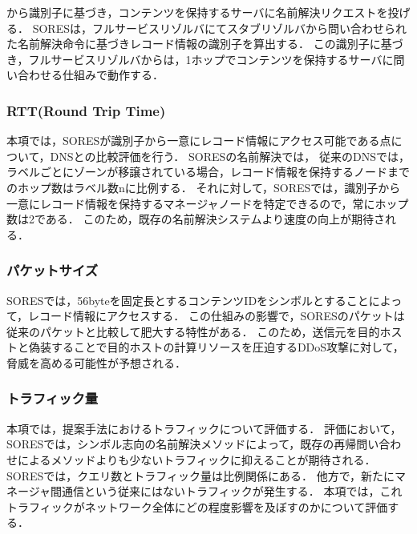 から識別子に基づき，コンテンツを保持するサーバに名前解決リクエストを投げる．
SORESは，フルサービスリゾルバにてスタブリゾルバから問い合わせられた名前解決命令に基づきレコード情報の識別子を算出する．
この識別子に基づき，フルサービスリゾルバからは，1ホップでコンテンツを保持するサーバに問い合わせる仕組みで動作する．
\subsubsection{RTT(Round Trip Time)}
本項では，SORESが識別子から一意にレコード情報にアクセス可能である点について，DNSとの比較評価を行う．
SORESの名前解決では，
従来のDNSでは，ラベルごとにゾーンが移譲されている場合，レコード情報を保持するノードまでのホップ数はラベル数nに比例する．
それに対して，SORESでは，識別子から一意にレコード情報を保持するマネージャノードを特定できるので，常にホップ数は2である．
このため，既存の名前解決システムより速度の向上が期待される．
\subsubsection{パケットサイズ}
SORESでは，56byteを固定長とするコンテンツIDをシンボルとすることによって，レコード情報にアクセスする．
この仕組みの影響で，SORESのパケットは従来のパケットと比較して肥大する特性がある．
このため，送信元を目的ホストと偽装することで目的ホストの計算リソースを圧迫するDDoS攻撃に対して，脅威を高める可能性が予想される．
\subsubsection{トラフィック量}
本項では，提案手法におけるトラフィックについて評価する．
評価において，
SORESでは，シンボル志向の名前解決メソッドによって，既存の再帰問い合わせによるメソッドよりも少ないトラフィックに抑えることが期待される．
SORESでは，クエリ数とトラフィック量は比例関係にある．
他方で，新たにマネージャ間通信という従来にはないトラフィックが発生する．
本項では，これトラフィックがネットワーク全体にどの程度影響を及ぼすのかについて評価する．


